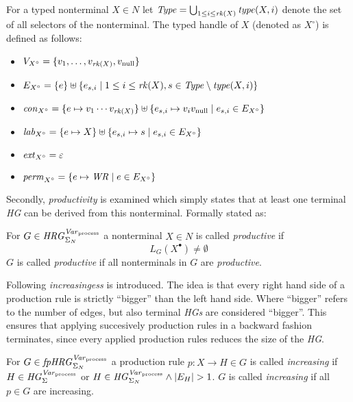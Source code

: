 	\begin{definition}
		For a typed nonterminal $X\in N$ let $\mathit{Type} =
		\bigcup_{1\leq i\leq\mathit{rk}(X)}\mathit{type}(X,i)$ denote the set of all selectors of
		the nonterminal. The typed handle of $X$ (denoted as $X^{\circ}$) is
		defined as follows:
		\begin{itemize}
			\item $V_{X^{\circ}} = \{v_{1},\dots,v_{\mathit{rk}(X)},v_{\text{null}}
				\}$
			\item $E_{X^{\circ}} = \{e\} \uplus \{e_{s,i}\mid 1\leq i\leq
				\mathit{rk}(X), s\in\mathit{Type}\setminus\mathit{type}(X,i)\}$
			\item $\mathit{con}_{X^{\circ}} = \{e\mapsto v_{1}\cdots v_{\mathit{rk}(X)}\}
				\uplus\{e_{s,i}\mapsto v_{i}v_{\text{null}}\mid e_{s,i}\in
				E_{X^{\circ}}\}$
			\item $\mathit{lab}_{X^{\circ}} = \{e\mapsto X\}\uplus\{e_{s,i}\mapsto s
				\mid e_{s,i}\in E_{X^{\circ}}\}$
			\item $\mathit{ext}_{X^{\circ}} = \varepsilon$
			\item $\mathit{perm}_{X^{\circ}} = \{e\mapsto\mathit{WR}\mid e\in
				E_{X^{\circ}}\}$
		\end{itemize}
	\end{definition}

	Secondly, \emph{productivity} is examined which simply states that at
	least one terminal \emph{\ac{HG}} can be derived from this nonterminal.
	Formally stated as:
	\begin{definition}[Productivity]
		For $G\in\mathit{HRG}_{\Sigma_{N}}^{\mathit{Var}_{\text{process}}}$ a nonterminal $X\in N$ is called \emph{productive} if
		\begin{equation*}
			L_{G}(X^{\bullet})\neq\emptyset
		\end{equation*}
		$G$ is called \emph{productive} if all nonterminals in $G$ are
		\emph{productive}.
	\end{definition}

	Following \emph{increasingess} is introduced. The idea is that every right
	hand side of a production rule is strictly \enquote{bigger} than the left
	hand side. Where \enquote{bigger} refers to the number of edges, but also
	terminal \emph{\acp{HG}} are considered \enquote{bigger}. This ensures that
	applying succesively production rules in a backward fashion terminates,
	since every applied production rules reduces the size of the \emph{\ac{HG}}.
	\begin{definition}[Increasingess]
		For $G\in\mathit{fpHRG}_{\Sigma_{N}}^{\mathit{Var}_{\text{process}}}$ a production rule $p\colon X\rightarrow H\in G$ is
		called \emph{increasing} if $H\in\mathit{HG}_{\Sigma}^{\mathit{Var}_{\text{process}}}$ or $H\in\mathit{HG}_{\Sigma_{N}}^{\mathit{Var}_{\text{process}}} \land |E_{H}| > 1$.
		$G$ is called \emph{increasing} if all $p\in G$ are increasing.
	\end{definition}

